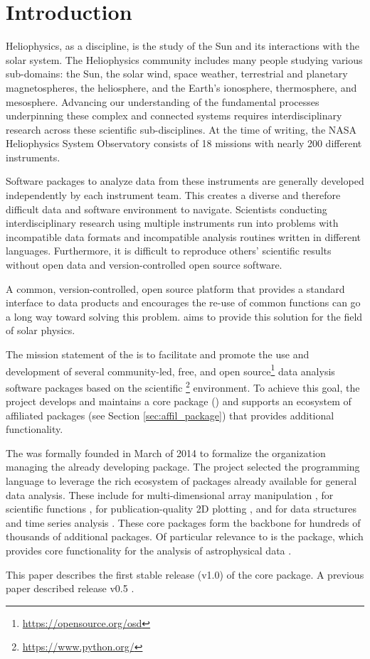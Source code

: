 \section{Introduction}
\label{sec:intro}

Heliophysics, as a discipline, is the study of the Sun and its interactions with the solar system.
The Heliophysics community includes many people studying various sub-domains: the Sun, the solar wind, space weather, terrestrial and planetary magnetospheres, the heliosphere, and the Earth's ionosphere, thermosphere, and mesosphere.
Advancing our understanding of the fundamental processes underpinning these complex and connected systems requires interdisciplinary research across these scientific sub-disciplines.
At the time of writing, the NASA Heliophysics System Observatory consists of 18 missions with nearly 200 different instruments.

Software packages to analyze data from these instruments are generally developed independently by each instrument team.
This creates a diverse and therefore difficult data and software environment to navigate.
Scientists conducting interdisciplinary research using multiple instruments run into problems with incompatible data formats and incompatible analysis routines written in different languages.
Furthermore, it is difficult to reproduce others' scientific results without open data and version-controlled open source software.

A common, version-controlled, open source platform that provides a standard interface to data products and encourages the re-use of common functions can go a long way toward solving this problem.
\sunpyproj aims to provide this solution for the field of solar physics.

The mission statement of the \sunpyproj is to facilitate and promote the use and development of several community-led, free, and open source\footnote{\url{https://opensource.org/osd}} data analysis software packages based on the scientific \python\footnote{\url{https://www.python.org/}} environment.
To achieve this goal, the project develops and maintains a core package (\sunpypkg) and supports an ecosystem of affiliated packages (see Section \ref{sec:affil_package}) that provides additional functionality.

The \sunpyproj was formally founded in March of 2014 to formalize the organization managing the already developing \sunpypkg package.
The project selected the \python programming language to leverage the rich ecosystem of packages already available for general data analysis.
These include \numpy for multi-dimensional array manipulation \citep{numpy},  for scientific functions \citep{scipy},  for publication-quality 2D plotting \citep{matplotlib}, and  for data structures and time series analysis \citep{pandas}.
These core packages form the backbone for hundreds of thousands of additional \python packages.
Of particular relevance to \sunpypkg is the \astropypkg package, which provides core functionality for the analysis of astrophysical data \citep{astropy2018}.

This paper describes the first stable release (v1.0) of the core package.
A previous paper described release v0.5 \citep{Community:2015cy}.
